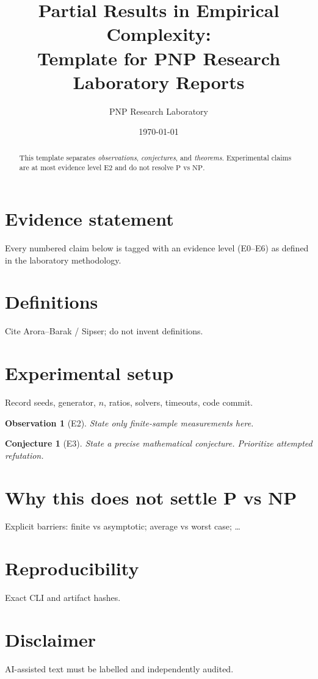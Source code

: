 \documentclass[11pt]{article}
\title{Partial Results in Empirical Complexity:\\
\large Template for PNP Research Laboratory Reports}
\author{PNP Research Laboratory}
\date{\today}
\newtheorem{conjecture}{Conjecture}
\newtheorem{observation}{Observation}
\begin{document}
\maketitle

\begin{abstract}
This template separates \emph{observations}, \emph{conjectures}, and \emph{theorems}.
Experimental claims are at most evidence level E2 and do not resolve $\mathrm{P}$ vs $\mathrm{NP}$.
\end{abstract}

\section{Evidence statement}
Every numbered claim below is tagged with an evidence level (E0--E6)
as defined in the laboratory methodology.

\section{Definitions}
Cite Arora--Barak / Sipser; do not invent definitions.

\section{Experimental setup}
Record seeds, generator, $n$, ratios, solvers, timeouts, code commit.

\begin{observation}[E2]
State only finite-sample measurements here.
\end{observation}

\begin{conjecture}[E3]
State a precise mathematical conjecture. Prioritize attempted refutation.
\end{conjecture}

\section{Why this does not settle P vs NP}
Explicit barriers: finite vs asymptotic; average vs worst case; \ldots

\section{Reproducibility}
Exact CLI and artifact hashes.

\section*{Disclaimer}
AI-assisted text must be labelled and independently audited.
\end{document}
